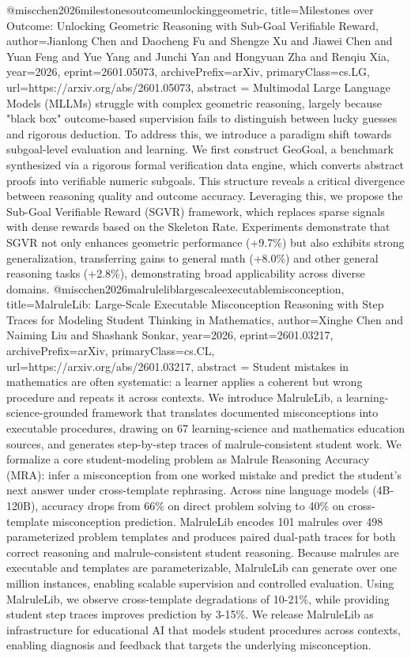 {}@misc{chen2026milestonesoutcomeunlockinggeometric,
      title={Milestones over Outcome: Unlocking Geometric Reasoning with Sub-Goal Verifiable Reward}, 
      author={Jianlong Chen and Daocheng Fu and Shengze Xu and Jiawei Chen and Yuan Feng and Yue Yang and Junchi Yan and Hongyuan Zha and Renqiu Xia},
      year={2026},
      eprint={2601.05073},
      archivePrefix={arXiv},
      primaryClass={cs.LG},
      url={https://arxiv.org/abs/2601.05073},
      abstract = {Multimodal Large Language Models (MLLMs) struggle with complex geometric reasoning, largely because "black box" outcome-based supervision fails to distinguish between lucky guesses and rigorous deduction. To address this, we introduce a paradigm shift towards subgoal-level evaluation and learning. We first construct GeoGoal, a benchmark synthesized via a rigorous formal verification data engine, which converts abstract proofs into verifiable numeric subgoals. This structure reveals a critical divergence between reasoning quality and outcome accuracy. Leveraging this, we propose the Sub-Goal Verifiable Reward (SGVR) framework, which replaces sparse signals with dense rewards based on the Skeleton Rate. Experiments demonstrate that SGVR not only enhances geometric performance (+9.7\%) but also exhibits strong generalization, transferring gains to general math (+8.0\%) and other general reasoning tasks (+2.8\%), demonstrating broad applicability across diverse domains.}
}@misc{chen2026malruleliblargescaleexecutablemisconception,
      title={MalruleLib: Large-Scale Executable Misconception Reasoning with Step Traces for Modeling Student Thinking in Mathematics}, 
      author={Xinghe Chen and Naiming Liu and Shashank Sonkar},
      year={2026},
      eprint={2601.03217},
      archivePrefix={arXiv},
      primaryClass={cs.CL},
      url={https://arxiv.org/abs/2601.03217},
      abstract = {Student mistakes in mathematics are often systematic: a learner applies a coherent but wrong procedure and repeats it across contexts. We introduce MalruleLib, a learning-science-grounded framework that translates documented misconceptions into executable procedures, drawing on 67 learning-science and mathematics education sources, and generates step-by-step traces of malrule-consistent student work. We formalize a core student-modeling problem as Malrule Reasoning Accuracy (MRA): infer a misconception from one worked mistake and predict the student's next answer under cross-template rephrasing. Across nine language models (4B-120B), accuracy drops from 66\% on direct problem solving to 40\% on cross-template misconception prediction. MalruleLib encodes 101 malrules over 498 parameterized problem templates and produces paired dual-path traces for both correct reasoning and malrule-consistent student reasoning. Because malrules are executable and templates are parameterizable, MalruleLib can generate over one million instances, enabling scalable supervision and controlled evaluation. Using MalruleLib, we observe cross-template degradations of 10-21\%, while providing student step traces improves prediction by 3-15\%. We release MalruleLib as infrastructure for educational AI that models student procedures across contexts, enabling diagnosis and feedback that targets the underlying misconception.}
}
